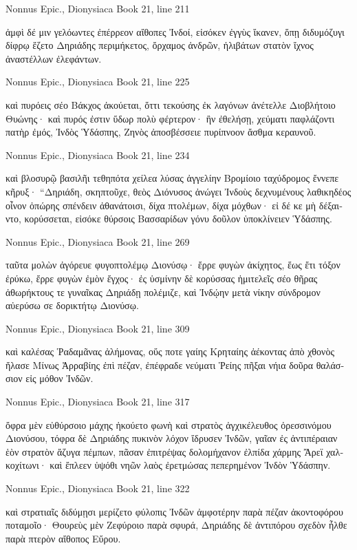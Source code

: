 \documentclass[12pt,letterpaper,twoside,final]{memoir}
\begin{document}
\begin{greek}
Nonnus Epic., Dionysiaca 
Book 21, line 211

ἀμφὶ δέ μιν γελόωντες ἐπέρρεον αἴθοπες Ἰνδοί, 
εἰσόκεν ἐγγὺς ἵκανεν, ὅπῃ διδυμόζυγι δίφρῳ 
ἕζετο Δηριάδης περιμήκετος, ὄρχαμος ἀνδρῶν, 
ἠλιβάτων στατὸν ἴχνος ἀναστέλλων ἐλεφάντων. 



Nonnus Epic., Dionysiaca 
Book 21, line 225

καὶ πυρόεις σέο Βάκχος ἀκούεται, ὅττι τεκούσης 
ἐκ λαγόνων ἀνέτελλε Διοβλήτοιο Θυώνης· 
καὶ πυρός ἐστιν ὕδωρ πολὺ φέρτερον· ἢν ἐθελήσῃ, 
χεύματι παφλάζοντι πατὴρ ἐμός, Ἰνδὸς Ὑδάσπης, 
Ζηνὸς ἀποσβέσσειε πυρίπνοον ἄσθμα κεραυνοῦ. 



Nonnus Epic., Dionysiaca 
Book 21, line 234

καὶ βλοσυρῷ βασιλῆι τεθηπότα χείλεα λύσας 
ἀγγελίην Βρομίοιο ταχύδρομος ἔννεπε κῆρυξ· 
 “Δηριάδη, σκηπτοῦχε, θεὸς Διόνυσος ἀνώγει 
Ἰνδοὺς δεχνυμένους λαθικηδέος οἶνον ὀπώρης 
σπένδειν ἀθανάτοισι, δίχα πτολέμων, δίχα μόχθων· 
εἰ δέ κε μὴ δέξαιντο, κορύσσεται, εἰσόκε θύρσοις 
Βασσαρίδων γόνυ δοῦλον ὑποκλίνειεν Ὑδάσπης. 



Nonnus Epic., Dionysiaca 
Book 21, line 269

ταῦτα μολὼν ἀγόρευε φυγοπτολέμῳ Διονύσῳ· 
ἔρρε φυγὼν ἀκίχητος, ἕως ἔτι τόξον ἐρύκω, 
ἔρρε φυγὼν ἐμὸν ἔγχος· ἐς ὑσμίνην δὲ κορύσσας 
ἡμιτελεῖς σέο θῆρας ἀθωρήκτους τε γυναῖκας 
Δηριάδῃ πολέμιζε, καὶ Ἰνδῴην μετὰ νίκην 
σύνδρομον αὐερύσω σε δορικτήτῳ Διονύσῳ. 



Nonnus Epic., Dionysiaca 
Book 21, line 309

καὶ καλέσας Ῥαδαμᾶνας ἀλήμονας, οὕς ποτε γαίης 
Κρηταίης ἀέκοντας ἀπὸ χθονὸς ἤλασε Μίνως 
Ἀρραβίης ἐπὶ πέζαν, ἐπέφραδε νεύματι Ῥείης 
πῆξαι νήια δοῦρα θαλάσσιον εἰς μόθον Ἰνδῶν. 



Nonnus Epic., Dionysiaca 
Book 21, line 317

ὄφρα μὲν εὐθύρσοιο μάχης ἠκούετο φωνὴ 
καὶ στρατὸς ἀγχικέλευθος ὀρεσσινόμου Διονύσου,   
τόφρα δὲ Δηριάδης πυκινὸν λόχον ἵδρυσεν Ἰνδῶν, 
γαῖαν ἐς ἀντιπέραιαν ἑὸν στρατὸν ἄζυγα πέμπων, 
πᾶσαν ἐπιτρέψας δολομήχανον ἐλπίδα χάρμης 
Ἄρεϊ χαλκοχίτωνι· καὶ ἔπλεεν ὑψόθι νηῶν 
λαὸς ἐρετμώσας πεπερημένον Ἰνδὸν Ὑδάσπην. 



Nonnus Epic., Dionysiaca 
Book 21, line 322

καὶ στρατιαῖς διδύμῃσι μερίζετο φύλοπις Ἰνδῶν 
ἀμφοτέρην παρὰ πέζαν ἀκοντοφόρου ποταμοῖο· 
Θουρεὺς μὲν Ζεφύροιο παρὰ σφυρά, Δηριάδης δὲ 
ἀντιπόρου σχεδὸν ἦλθε παρὰ πτερὸν αἴθοπος Εὔρου. 




\end{greek}
\end{document}
